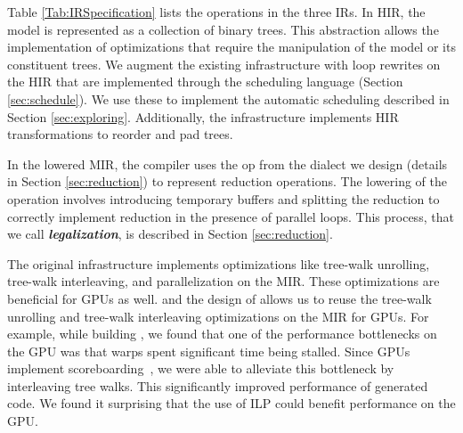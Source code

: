 Table \ref{Tab:IRSpecification} lists the operations in the three IRs. 
In HIR, the model is represented as a collection of binary trees. This abstraction
allows the implementation of optimizations that require the manipulation of the model
or its constituent trees. We augment the existing \TreebeardOLD{} infrastructure with loop rewrites on 
the HIR that are implemented through the scheduling language (Section \ref{sec:schedule}).
We use these to implement the automatic scheduling described in Section \ref{sec:exploring}. 
Additionally, the \TreebeardOLD{} infrastructure implements HIR transformations to reorder and pad 
trees. 

In the lowered MIR, the compiler uses the  op from 
the  dialect we design (details in Section \ref{sec:reduction})
to represent reduction operations. The lowering of the  operation 
involves introducing temporary buffers and splitting the reduction 
to correctly implement reduction in the presence of 
parallel loops. This process, that we call \textbf{\emph{legalization}}, is 
described in Section \ref{sec:reduction}. 

The original \TreebeardOLD{} infrastructure implements optimizations like 
tree-walk unrolling, tree-walk interleaving, and parallelization
on the MIR. These optimizations are beneficial for GPUs as well.
and the design of \TreebeardOLD{} allows us to reuse the tree-walk 
unrolling and tree-walk interleaving optimizations on the MIR for GPUs.
For example, while building \Treebeard{}, we found that one of the performance bottlenecks on the 
GPU was that warps spent significant time being stalled. Since GPUs 
implement scoreboarding~\cite{HennesseyPatterson}, we were able to alleviate this bottleneck by
interleaving tree walks. This significantly improved performance of generated 
code. We found it surprising that the use of ILP could benefit 
performance on the GPU.  

